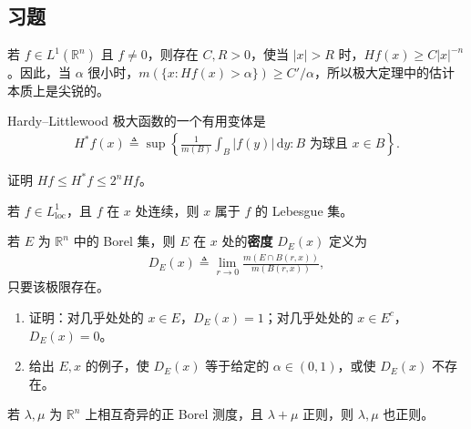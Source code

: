 \documentclass[../../main.tex]{subfiles}%
\begin{document}
\subsection*{习题}
\begin{exercise}\label{exercise:ch03-maximal-sharpness}
若 $f\in L^1(\mathbb{R}^n)$ 且 $f\ne0$，则存在 $C,R>0$，使当 $|x|>R$ 时，$Hf(x)\ge C|x|^{-n}$。因此，当 $\alpha$ 很小时，$m(\{x:Hf(x)>\alpha\})\ge C'/\alpha$，所以极大定理中的估计本质上是尖锐的。
\end{exercise}
\begin{exercise}\label{exercise:ch03-uncentered-maximal}
\begin{definition*}[极大函数的一个变体]
Hardy–Littlewood 极大函数的一个有用变体是
\begin{align*}
H^*f(x)\triangleq\sup\left\{\frac1{m(B)}\int_B|f(y)|\,\mathrm{d}y:B\text{ 为球且 }x\in B\right\}.
\end{align*}
\end{definition*}
证明 $Hf\le H^*f\le2^nHf$。
\end{exercise}
\begin{exercise}\label{exercise:ch03-continuity-lebesgue-point}
若 $f\in L^1_{\mathrm{loc}}$，且 $f$ 在 $x$ 处连续，则 $x$ 属于 $f$ 的 Lebesgue 集。
\end{exercise}
\begin{exercise}\label{exercise:ch03-set-density}
\begin{definition*}[集合在一点的密度]
若 $E$ 为 $\mathbb{R}^n$ 中的 Borel 集，则 $E$ 在 $x$ 处的\textbf{密度} $D_E(x)$ 定义为
\begin{align*}
D_E(x)\triangleq\lim_{r\to0}\frac{m(E\cap B(r,x))}{m(B(r,x))},
\end{align*}
只要该极限存在。
\end{definition*}
\begin{enumerate}
\item 证明：对几乎处处的 $x\in E$，$D_E(x)=1$；对几乎处处的 $x\in E^c$，$D_E(x)=0$。
\item 给出 $E,x$ 的例子，使 $D_E(x)$ 等于给定的 $\alpha\in(0,1)$，或使 $D_E(x)$ 不存在。
\end{enumerate}
\end{exercise}
\begin{exercise}\label{exercise:ch03-regular-singular-components}
若 $\lambda,\mu$ 为 $\mathbb{R}^n$ 上相互奇异的正 Borel 测度，且 $\lambda+\mu$ 正则，则 $\lambda,\mu$ 也正则。
\end{exercise}
\end{document}
